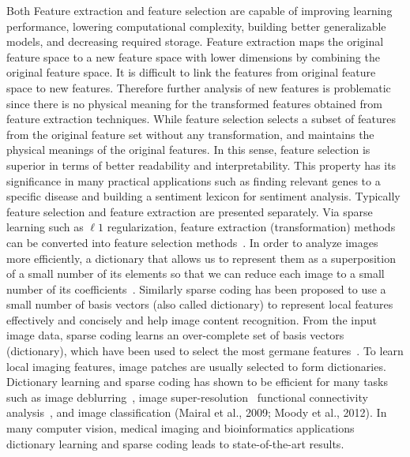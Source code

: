 Both Feature extraction and feature selection are capable of improving learning performance, lowering computational complexity, building better generalizable models, and decreasing required storage. Feature extraction maps the original feature space to a new feature space with lower dimensions by combining the original feature space. It is difficult to link the features from original feature space to new features. Therefore further analysis of new features is problematic since there is no physical meaning for the transformed features obtained from feature extraction techniques. While feature selection selects a subset of features from the original feature set without any transformation, and maintains the physical meanings of the original features. In this sense, feature selection is superior in terms of better readability and interpretability. This property has its significance in many practical applications such as finding relevant genes to a specific disease and building a sentiment lexicon for sentiment analysis. Typically feature selection and feature extraction are presented separately. Via sparse learning such as $\ell1$ regularization, feature extraction (transformation) methods can be converted into feature selection methods~\citep{masaeli2010transformation}. In order to analyze images more efficiently, a dictionary that allows us to represent them as a superposition of a small number of its elements so that we can reduce each image to a small number of its coefficients~\citep{schnass2008dictionary}. Similarly sparse coding \citep{lin2014stochastic} has been proposed to use a small number of basis vectors (also called dictionary) to represent local features effectively and concisely and help image content recognition. From the input image data, sparse coding learns an over-complete set of basis vectors (dictionary), which have been used to select the most germane features~\citep*{friedman2001elements}. To learn local imaging features, image patches are usually selected to form dictionaries. Dictionary learning and sparse coding \citep{mairal2009online} has shown to be efficient for many tasks such as image deblurring~\citep{yin2008bregman}, image super-resolution~\citep{yin2008bregman} functional connectivity analysis~\cite{lv2015holistic,lv2015modeling}, and image classification (Mairal et al., 2009; Moody et al., 2012). In many computer vision, medical imaging and bioinformatics applications~\citep{mairal2009online,moody2012unsupervised,lv2015modeling} dictionary learning and sparse coding leads to state-of-the-art results.

